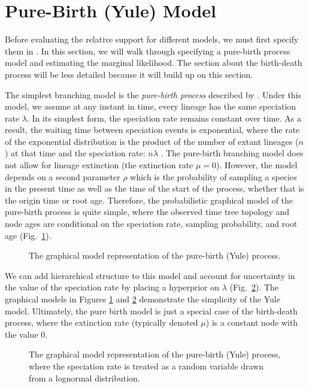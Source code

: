 

\bigskip
\section{Pure-Birth (Yule) Model}\label{yuleModSec}

Before evaluating the relative support for different models, we must first specify them in \Rev.
In this section, we will walk through specifying a pure-birth process model and estimating the marginal likelihood. 
The section about the birth-death process will be less detailed because it will build up on this section.

The simplest branching model is the \emph{pure-birth process} described by \cite{Yule1925}. 
Under this model, we assume at any instant in time, every lineage has the same speciation rate $\lambda$.
In its simplest form, the speciation rate remains constant over time. 
As a result, the waiting time between speciation events is exponential, where the rate of the exponential distribution is the product of the number of extant lineages ($n$) at that time and the speciation rate: $n\lambda$ \citep{Yule1925,Aldous2001,Hoehna2014a}. 
The pure-birth branching model does not allow for lineage extinction (\IE the extinction rate $\mu=0$). 
However, the model depends on a second parameter $\rho$ which is the probability of sampling a species in the present time as well as the time of the start of the process, whether that is the origin time or root age.
Therefore, the probabilistic graphical model of the pure-birth process is quite simple, where the observed time tree topology and node ages are conditional on the speciation rate, sampling probability, and root age (Fig.~\ref{fig:yule_gm}).
\begin{figure}[h!]
\centering
{}
\caption{\small The graphical model representation of the pure-birth (Yule) process.}
\label{fig:yule_gm}
\end{figure}

We can add hierarchical structure to this model and account for uncertainty in the value of the speciation rate by placing a hyperprior on $\lambda$ (Fig.~\ref{fig:yule_gm2}). 
The graphical models in Figures \ref{fig:yule_gm} and \ref{fig:yule_gm2} demonstrate the simplicity of the Yule model. 
Ultimately, the pure birth model is just a special case of the birth-death process, where the extinction rate (typically denoted $\mu$) is a constant node with the value 0. 
\begin{figure}[h!]
\centering
{}
\caption{\small The graphical model representation of the pure-birth (Yule) process, where the speciation rate is treated as a random variable drawn from a lognormal distribution.}
\label{fig:yule_gm2}
\end{figure}

